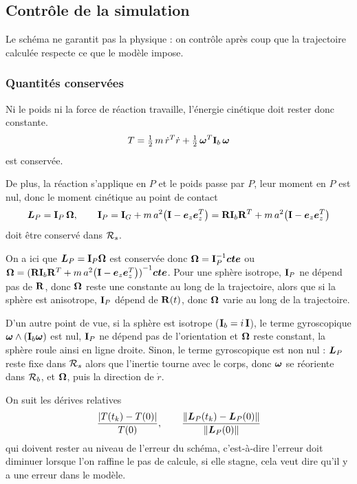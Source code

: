 \subsection{Contrôle de la simulation}

Le schéma ne garantit pas la physique : on contrôle après coup que la
trajectoire calculée respecte ce que le modèle impose.

\subsubsection{Quantités conservées}

Ni le poids ni la force de réaction travaille, l'énergie cinétique doit rester donc constante.
\[
    T = \tfrac12\,m\,\dot r^T\dot r
    + \tfrac12\,\bm{\omega}^T\mathbf{I}_b\,\bm{\omega}
\]
est conservée. 

De plus, la réaction s'applique en $P$ et le poids passe
par $P$, leur moment en $P$ est nul, donc le moment cinétique au point
de contact 
\[
    \bm{L}_P = \mathbf{I}_P\,\bm{\Omega},
    \qquad
    \mathbf{I}_P = \mathbf{I}_G + m\,a^2\bigl(\mathbf{I} - \bm{e}_z\bm{e}_z^T\bigr) = \mathbf{R} \mathbf{I}_b \mathbf{R} ^T + m\,a^2\bigl(\mathbf{I} - \bm{e}_z\bm{e}_z^T\bigr)
\]
doit être conservé dans $\mathcal{R}_{s}$.

\begin{remarque}
    On a ici que $\bm{L}_P = \mathbf{I}_P \bm{\Omega}$ est conservée donc $\bm{\Omega} = \mathbf{I}_P ^{-1} \bm{cte}$ ou $\bm{\Omega} = {(\mathbf{R} \mathbf{I}_b \mathbf{R} ^T + m\,a^2\bigl(\mathbf{I} - \bm{e}_z\bm{e}_z^T\bigr) )}^{-1}\bm{cte}$. Pour une sphère isotrope, $\mathbf{I}_P$ ne dépend pas de $\mathbf{R}$, donc $\bm{\Omega}$ reste une constante au long de la trajectoire, alors que si la sphère est anisotrope, $\mathbf{I}_P$ dépend de $\mathbf{R}(t)$, donc $\bm{\Omega}$ varie au long de la trajectoire. 

    D'un autre point de vue, si la sphère est isotrope ($\mathbf{I}_b = i\,\mathbf{I}$),
    le terme gyroscopique $\bm{\omega}\wedge(\mathbf{I}_b\bm{\omega})$ est nul,
    $\mathbf{I}_P$ ne dépend pas de l'orientation et $\bm{\Omega}$ reste constant,
    la sphère roule ainsi en ligne droite. Sinon, le terme gyroscopique est non nul :
    $\bm{L}_P$ reste fixe dans $\mathcal{R}_{s}$ alors que l'inertie tourne avec le
    corps, donc $\bm{\omega}$ se réoriente dans $\mathcal{R}_{b}$, et $\bm{\Omega}$,
    puis la direction de $\dot{r}$.
\end{remarque}
On suit les dérives relatives
\[
    \frac{|T(t_k) - T(0)|}{T(0)},
    \qquad
    \frac{\|\bm{L}_P(t_k) - \bm{L}_P(0)\|}{\|\bm{L}_P(0)\|}
\]
qui doivent rester au niveau de l'erreur du schéma, c'est-à-dire l'erreur doit diminuer lorsque l'on raffine le pas de calcule, si elle stagne, cela veut dire qu'il y a une erreur dans le modèle. 

